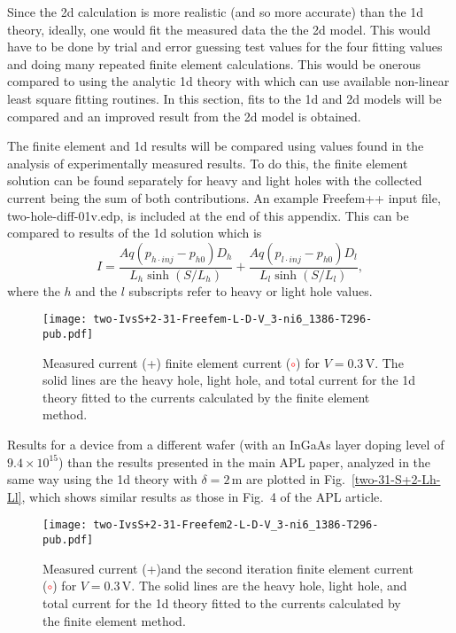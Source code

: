 Since the 2d calculation is more realistic (and so more accurate)
 than the 1d theory, ideally,
 one would fit the measured data the the 2d model.  This would have to 
be done by trial and error guessing test values for the four fitting values
and doing many repeated finite element calculations.  This would be onerous
compared to using the analytic 1d theory with which can use available
non-linear least square fitting routines.  In this section, fits to the 1d
 and 2d models will be compared and an improved result from the 2d model
is obtained.

The finite element and 1d results will be compared using values found
in the analysis of experimentally measured results.
To do this, the finite element solution can be found separately for heavy and light
holes with the collected current being the sum of both contributions.
An example Freefem++ input file, two-hole-diff-01v.edp, is included at the
end of this appendix.
This can be compared to results of the 1d solution which is
\begin{equation}
I = \frac{Aq(p_{h\cdot inj}-p_{h0})D_h}{L_h\sinh(S/L_h)}
   + \frac{Aq(p_{l\cdot inj}-p_{h0})D_l}{L_l\sinh(S/L_l)},
\label{eq:two-1d}\end{equation}
where the $h$ and the $l$ subscripts refer to heavy or light hole
values.

\begin{figure}
\centering
\texttt{[image: two-IvsS+2-31-Freefem-L-D-V\_3-ni6\_1386-T296-pub.pdf]}
\caption{Measured current (\textcolor[rgb]{0.5,0,0.5}{+}) finite element current
 (\textcolor{red}{$\circ$}) for $V=0.3$\,V.  The solid lines are the heavy hole,
light hole, and total current for the 1d theory fitted to the currents
calculated by the finite element method.
}%
\label{two-IvsS+2-31-Freefem-L-D-V_3-ni6_1386-T296}
\end{figure}

Results for a device from a different wafer (with an InGaAs layer doping
level of $9.4\times10^{15}$) than the results presented
in the main APL paper, analyzed in the same way using the 1d theory with
 $\delta = 2$\,\textmu m are plotted in Fig.~\ref{two-31-S+2-Lh-Ll},
which shows similar results as those in Fig.~4 of the APL article.

\begin{figure}[b]
\centering
\texttt{[image: two-IvsS+2-31-Freefem2-L-D-V\_3-ni6\_1386-T296-pub.pdf]}
\caption{Measured current (\textcolor[rgb]{0.5,0,0.5}{+})and the second iteration
 finite element current
 (\textcolor{red}{$\circ$}) for $V=0.3$\,V.  The solid lines are the heavy hole,
light hole, and total current for the 1d theory fitted to the currents
calculated by the finite element method.
}%
\label{two-IvsS+2-31-Freefem2-L-D-V_3-ni6_1386-T296}
\end{figure}

